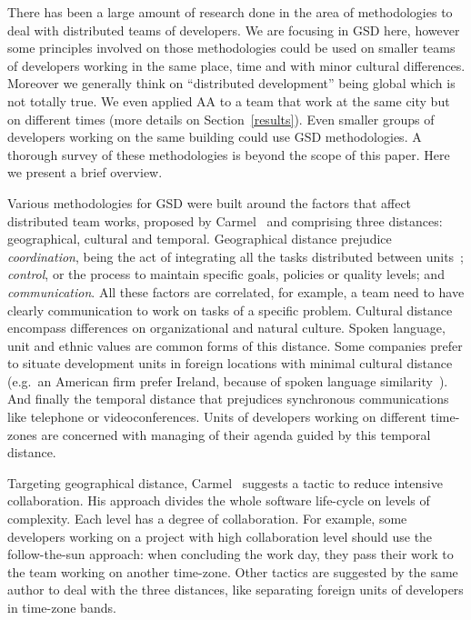 \documentclass[letterpaper]{article}
\newcommand{\indraftnote}[1]{\textcolor{blue}{\texttt{\footnotesize[#1]}}}
\newcommand{\todo}[1]{\indraftnote{todo: #1}}
\begin{document}


There has been a large amount of research done in the area of
methodologies to deal with distributed teams of developers. We are
focusing in GSD here, however some principles involved on those
methodologies could be used on smaller teams of developers working in
the same place, time and with minor cultural differences. Moreover we
generally think on ``distributed development'' being global which is
not totally true. We even applied AA to a team that work at the same
city but on different times (more details on
Section~\ref{results}). Even smaller groups of developers working on
the same building could use GSD methodologies. A thorough survey of
these methodologies is beyond the scope of this paper. Here we present
a brief overview.

Various methodologies for GSD were built around the factors that
affect distributed team works, proposed by Carmel~\cite{carmel1999}
and comprising three distances: geographical, cultural and
temporal. Geographical distance prejudice \emph{coordination}, being
the act of integrating all the tasks distributed between
units~\cite{carmel2001}; \emph{control}, or the process to maintain
specific goals, policies or quality levels; and
\emph{communication}. All these factors are correlated, for example, a
team need to have clearly communication to work on tasks of a specific
problem. Cultural distance encompass differences on organizational and
natural culture. Spoken language, unit and ethnic values are common
forms of this distance. Some companies prefer to situate development
units in foreign locations with minimal cultural distance (e.g.\ an
American firm prefer Ireland, because of spoken language
similarity~\cite{carmel2001}). And finally the temporal distance that
prejudices synchronous communications like telephone or
videoconferences. Units of developers working on different time-zones
are concerned with managing of their agenda guided by this temporal
distance.

Targeting geographical distance, Carmel~\cite{carmel2001} suggests a
tactic to reduce intensive collaboration. His approach divides the
whole software life-cycle on levels of complexity. Each level has a
degree of collaboration. For example, some developers working on a
project with high collaboration level should use the follow-the-sun
approach: when concluding the work day, they pass their work to the
team working on another time-zone. Other tactics are suggested by the
same author to deal with the three distances, like separating foreign
units of developers in time-zone bands.
\end{document}
